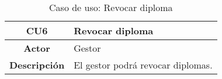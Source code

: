 \begin{table}[t]
	\begin{center}
		\begin{tabular}{|c|p{10cm}|}
			\hline \textbf{CU6} & Revocar diploma \\ 
			\hline \textbf{Actor} & Gestor\\ 
			\hline \textbf{Descripci\'on} & El gestor podr\'a revocar diplomas.\\ 
			\hline 
		\end{tabular}
		\caption{Caso de uso: Revocar diploma}
		\label{tab:CU6}
	\end{center}
\end{table}


